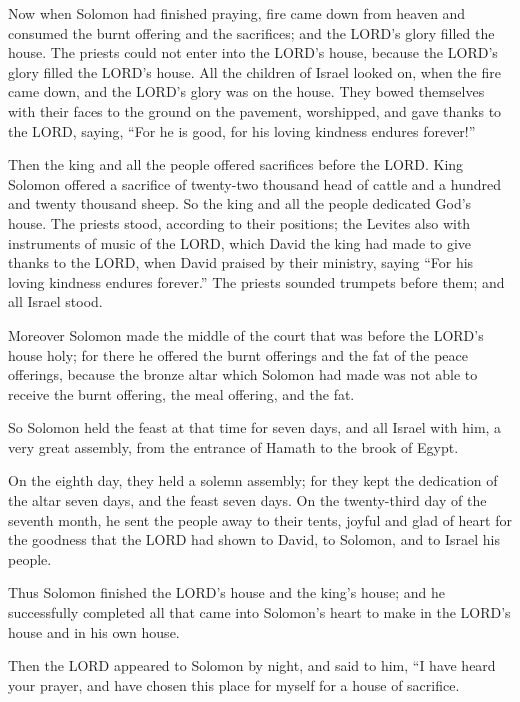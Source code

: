  Now when Solomon had finished praying, fire came down from
heaven and consumed the burnt offering and the sacrifices; and the
LORD's glory filled the house.  The priests could not enter
into the LORD's house, because the LORD's glory filled the LORD's house.
 All the children of Israel looked on, when the fire came
down, and the LORD's glory was on the house. They bowed themselves with
their faces to the ground on the pavement, worshipped, and gave thanks
to the LORD, saying, ``For he is good, for his loving kindness endures
forever!''

 Then the king and all the people offered sacrifices before
the LORD.  King Solomon offered a sacrifice of twenty-two
thousand head of cattle and a hundred and twenty thousand sheep. So the
king and all the people dedicated God's house.  The priests
stood, according to their positions; the Levites also with instruments
of music of the LORD, which David the king had made to give thanks to
the LORD, when David praised by their ministry, saying ``For his loving
kindness endures forever.'' The priests sounded trumpets before them;
and all Israel stood.

 Moreover Solomon made the middle of the court that was
before the LORD's house holy; for there he offered the burnt offerings
and the fat of the peace offerings, because the bronze altar which
Solomon had made was not able to receive the burnt offering, the meal
offering, and the fat.

 So Solomon held the feast at that time for seven days, and
all Israel with him, a very great assembly, from the entrance of Hamath
to the brook of Egypt.

 On the eighth day, they held a solemn assembly; for they
kept the dedication of the altar seven days, and the feast seven days.
 On the twenty-third day of the seventh month, he sent the
people away to their tents, joyful and glad of heart for the goodness
that the LORD had shown to David, to Solomon, and to Israel his people.

 Thus Solomon finished the LORD's house and the king's
house; and he successfully completed all that came into Solomon's heart
to make in the LORD's house and in his own house.

 Then the LORD appeared to Solomon by night, and said to
him, ``I have heard your prayer, and have chosen this place for myself
for a house of sacrifice.

